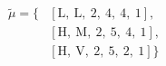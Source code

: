 \begin{equation}
\nonumber
\begin{aligned}
\tilde{\mu} = \{  & \left[\text{L}, \ \text{L}, \ \text{2}, \ \text{4}, \ \text{4}, \ \text{1}\right], \\  & \left[\text{H}, \ \text{M}, \ \text{2}, \ \text{5}, \ \text{4}, \ \text{1}\right], \\  & \left[\text{H}, \ \text{V}, \ \text{2}, \ \text{5}, \ \text{2}, \ \text{1}\right]\} \\ 
\end{aligned}
\end{equation} \\ 